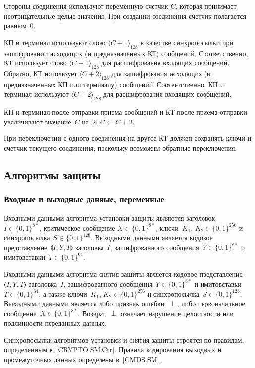 Стороны соединения используют переменную-счетчик $C$, которая принимает 
неотрицательные целые значения. При создании соединения счетчик 
полагается равным~$0$.

КП и терминал используют слово $\langle C + 1\rangle_{128}$ в качестве 
синхропосылки при зашифровании исходящих (и предназначенных КТ) сообщений. 
Соответственно, КТ использует слово $\langle C + 1\rangle_{128}$ для 
расшифрования входящих сообщений. Обратно, КТ использует 
$\langle C + 2\rangle_{128}$ для зашифрования исходящих (и предназначенных КП 
или терминалу) сообщений. Соответственно, КП и терминал используют 
$\langle C + 2\rangle_{128}$ для расшифрования входящих сообщений. 

КП и терминал после отправки-приема сообщений и КТ после приема-отправки 
увеличивают значение~$C$ на~$2$: $C\gets C + 2$.

При переключении с одного соединения на другое КТ должен сохранять ключи и 
счетчик текущего соединения, поскольку возможны обратные переключения.

\subsection{Алгоритмы защиты}\label{CRYPTO.SM.Algs}

\subsubsection{Входные и выходные данные, переменные}
\label{CRYPTO.SM.Algs.InOut}

Входными данными алгоритма установки защиты являются заголовок~$I\in\{0,1\}^{8*}$, 
критическое сообщение $X \in\{0,1\}^{8*}$, ключи~$K_1$, $K_2\in\{0,1\}^{256}$ 
и синхропосылка~$S\in\{0,1\}^{128}$. Выходными данными является кодовое 
представление~$\llangle I, Y, T \rrangle$ заголовка~$I$, 
зашифрованного сообщения~$Y\in\{0,1\}^{8*}$ и имитовставки~$T\in\{0,1\}^{64}$.

Входными данными алгоритма снятия защиты является кодовое представление 
$\llangle I,Y,T\rrangle$ заголовка~$I$, зашифрованного 
сообщения~$Y\in\{0,1\}^{8*}$ и имитовставки $T\in\{0,1\}^{64}$, а также 
ключи~$K_1$, $K_2\in\{0,1\}^{256}$ и синхропосылка~$S\in\{0,1\}^{128}$. 
Выходными данными является либо признак ошибки~$\perp$, либо первоначальное 
сообщение~$X\in\{0,1\}^{8*}$. Возврат~$\perp$ означает нарушение целостности 
или подлинности переданных данных.

Синхропосылки алгоритмов установки и снятия защиты строятся по правилам, 
определенным в~\ref{CRYPTO.SM.Ctr}. Правила кодирования выходных и 
промежуточных данных определены в~\ref{CMDS.SM}.

